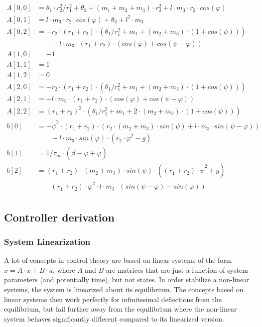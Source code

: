 \documentclass{article}
\begin{document}
\begin{align*}
A[0,0] &= \theta_1 \cdot r_2^2/r_1^2 + \theta_2 + (m_1 + m_2 + m_3) \cdot r_2^2 + l \cdot m_3 \cdot r_2 \cdot cos(\varphi)\\
A[0,1] &= l \cdot m_3 \cdot r_2 \cdot cos(\varphi) + \theta_3 + l^2 \cdot m_3 \\
A[0,2] &= -r_2 \cdot (r_1 + r_2) \cdot (\theta_1/r_1^2  + m_1 + (m_2+m_3) \cdot (1+cos(\psi))) \\
&\qquad -l \cdot m_3 \cdot (r_1 + r_2) \cdot (cos(\varphi) + cos(\psi - \varphi)) \\
A[1,0] &= -1 \\
A[1,1] &= 1 \\
A[1,2] &= 0 \\
A[2,0] &= -r_2 \cdot (r_1 + r_2) \cdot (\theta_1/r_1^2  + m_1 + (m_2+m_3) \cdot (1+cos(\psi))) \\
A[2,1] &= -l \cdot m_3 \cdot (r_1 + r_2) \cdot (cos(\varphi) + cos(\psi - \varphi)) \\
A[2,2] &= (r_1 + r_2)^2 \cdot (\theta_1/r_1^2 + m_1 + 2 \cdot (m_2+m_3) \cdot (1+cos(\psi))) \\
b[0] &= - \dot{\psi}^2 \cdot (r_1 + r_2) \cdot ( r_2 \cdot (m_2+m_3) \cdot sin(\psi) +  l \cdot m_3 \cdot sin(\psi - \varphi)) \\
&\qquad  + l \cdot m_3 \cdot sin(\varphi) \cdot (r_2 \cdot  \dot{\varphi}^2 - g) \\
b[1] &= 1/\tau_m \cdot (\dot{\beta} - \dot{\varphi} + \breve{\dot{\varphi}}) \\
b[2] &= (r_1 + r_2) \cdot (m_2+m_3) \cdot sin(\psi) \cdot ((r_1 + r_2) \cdot \dot{\psi}^2 + g) \\
&\qquad (r_1 + r_2) \cdot \dot{\varphi}^2 \cdot l \cdot m_3 \cdot (sin(\psi - \varphi)-sin(\varphi)) \\
\end{align*}

\subsection{Controller derivation}

\subsubsection{System Linearization}

A lot of concepts in control theory are based on linear systems of the form $\dot{x} = A \cdot x + B \cdot u$, where $A$ and $B$ are matrices that are just a function of system parameters (and potentially time), but not states.
In order stabilize a non-linear systems, the system is linearized about its equilibrium.
The concepts based on linear systems then work perfectly for infinitesimal deflections from the equilibrium, but fail further away from the equilibrium where the non-linear system behaves significantly different compared to its linearized version.
\end{document}
